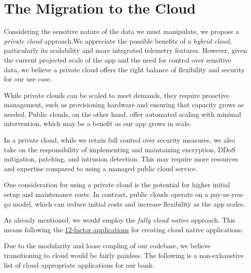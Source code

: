 \documentclass{article}
\begin{document}
	\section{The Migration to the Cloud}
	\par Considering the sensitive nature of the data we must manipulate, we propose a \textit{private cloud} approach.We appreciate the possible benefits of a \textit{hybrid cloud}, particularly its scalability and more integrated telemetry features. However, given the current projected scale of the app and the need for control over sensitive data, we believe a private cloud offers the right balance of flexibility and security for our use case.
	\par While private clouds can be scaled to meet demands, they require proactive management, such as provisioning hardware and ensuring that capacity grows as needed. Public clouds, on the other hand, offer automated scaling with minimal intervention, which may be a benefit as our app grows in scale.
	\par In a private cloud, while we retain full control over security measures, we also take on the responsibility of implementing and maintaining encryption, DDoS mitigation, patching, and intrusion detection. This may require more resources and expertise compared to using a managed public cloud service.
	\par One consideration for using a private cloud is the potential for higher initial setup and maintenance costs. In contrast, public clouds operate on a pay-as-you-go model, which can reduce initial costs and increase flexibility as the app scales.
	\par As already mentioned, we would employ the \textit{fully cloud native} approach. This means following the \href{https://developer.ibm.com/articles/creating-a-12-factor-application-with-open-liberty}{12-factor applications} for creating cloud native applications.
	\par Due to the modularity and loose coupling of our codebase, we believe transitioning to cloud would be fairly painless. The following is a non-exhaustive list of cloud appropriate applications for our bank.
\end{document}
